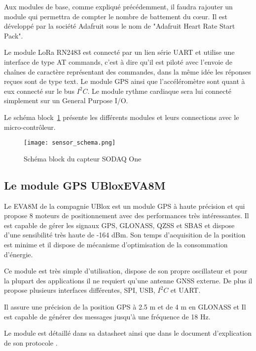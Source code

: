 Aux modules de base, comme expliqué précédemment, il faudra rajouter un module qui permettra de compter le nombre de battement du cœur. Il est développé par la société Adafruit sous le nom de "Adafruit Heart Rate Start Pack".


Le module LoRa RN2483 est connecté par un lien série UART et utilise une interface de type AT commands, c'est à dire qu'il est piloté avec l'envoie de chaînes de caractère représentant des commandes, dans la même idée les réponses reçues sont de type text. Le module GPS ainsi que l'accéléromètre sont quant à eux connecté sur le bus $I^{2}C$. Le module rythme cardiaque sera lui connecté simplement sur un General Purpose I/O.

Le schéma block~\ref{fig:schema_block_sodaq} présente les différents modules et leurs connections avec le micro-contrôleur.


\begin{figure}[htb]
\centering 
\texttt{[image: sensor\_schema.png]} 
\caption{Schéma block du capteur SODAQ One}
\label{fig:schema_block_sodaq}
\end{figure}

\subsection{Le module GPS UBloxEVA8M}\label{ch:module_ubloxeva8m}

Le EVA8M de la compagnie UBlox est un module GPS à haute précision et qui propose 8 moteurs de positionnement avec des performances très intéressantes. Il est capable de gérer les signaux GPS, GLONASS, QZSS et SBAS et dispose d'une sensibilité très haute de -164 dBm. Son temps d'acquisition de la position est minime et il dispose de mécanisme d'optimisation de la consommation d'énergie.

Ce module est très simple d'utilisation, dispose de son propre oscillateur et pour la plupart des applications il ne requiert qu'une antenne GNSS externe. De plus il propose plusieurs interfaces différentes, SPI, USB, $I^{2}C$ et UART.

Il assure une précision de la position GPS à 2.5 m et de 4 m en GLONASS et Il est capable de générer des messages jusqu'à une fréquence de 18 Hz.

Le module est détaillé dans sa datasheet \cite{ublox-datasheet} ainsi que dans le document d'explication de son protocole \cite{ublox-protocol}.

